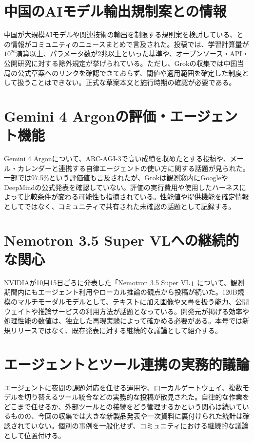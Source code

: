 \section{中国のAIモデル輸出規制案との情報}
中国が大規模AIモデルや関連技術の輸出を制限する規則案を検討している、との情報がコミュニティのニュースまとめで言及された。投稿では、学習計算量が$10^{26}$演算以上、パラメータ数が2兆以上といった基準や、オープンソース・API・公開研究に対する除外規定が挙げられている。ただし、Grokの収集では中国当局の公式草案へのリンクを確認できておらず、閾値や適用範囲を確定した制度として扱うことはできない。正式な草案本文と施行時期の確認が必要である。

\section{Gemini 4 Argonの評価・エージェント機能}
Gemini 4 Argonについて、ARC-AGI-3で高い成績を収めたとする投稿や、メール・カレンダーと連携する自律エージェントの使い方に関する話題が見られた。一部では97.5\%という評価値も言及されたが、Grokは観測窓内にGoogleやDeepMindの公式発表を確認していない。評価の実行費用や使用したハーネスによって比較条件が変わる可能性も指摘されている。性能値や提供機能を確定情報としてではなく、コミュニティで共有された未確認の話題として記録する。

\section{Nemotron 3.5 Super VLへの継続的な関心}
NVIDIAが10月15日ごろに発表した「Nemotron 3.5 Super VL」について、観測期間内にもエージェント利用やローカル推論の観点から投稿が続いた。120B規模のマルチモーダルモデルとして、テキストに加え画像や文書を扱う能力、公開ウェイトや推論サービスの利用方法が話題となっている。開発元が掲げる効率や処理性能の数値は、独立した再現実験によって確かめる必要がある。本号では新規リリースではなく、既存発表に対する継続的な議論として紹介する。

\section{エージェントとツール連携の実務的議論}
エージェントに夜間の課題対応を任せる運用や、ローカルゲートウェイ、複数モデルを切り替えるツール統合などの実務的な投稿が散見された。自律的な作業をどこまで任せるか、外部ツールとの接続をどう管理するかという関心は続いているものの、今回の収集では大きな新製品発表や一次資料に裏付けられた統計は確認されていない。個別の事例を一般化せず、コミュニティにおける継続的な議論として位置付ける。
